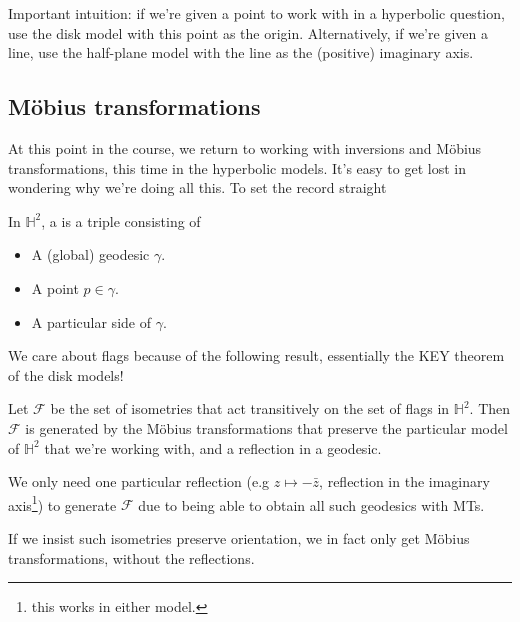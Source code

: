 \documentclass[11pt]{scrartcl}
\begin{document}
Important intuition: if we're given a point to work with in a hyperbolic question, use the disk model with this point as the origin. Alternatively, if we're given a line, use the half-plane model with the line as the (positive) imaginary axis.

\subsection{M{\"o}bius transformations}

At this point in the course, we return to working with inversions and M{\"o}bius transformations, this time in the hyperbolic models. It's easy to get lost in wondering why we're doing all this. To set the record straight

\begin{definition}
In $\mathbb{H}^2$, a  is a triple consisting of

\begin{itemize}
    \item A (global) geodesic $\gamma$.
    \item A point $p \in \gamma$.
    \item A particular side of $\gamma$.
\end{itemize}
\end{definition}

We care about flags because of the following result, essentially the KEY theorem of the disk models!

\begin{proposition}
Let $\mathcal{F}$ be the set of isometries that act transitively on the set of flags in $\mathbb{H}^2$. Then $\mathcal{F}$ is generated by the M{\"o}bius transformations that preserve the particular model of $\mathbb{H}^2$ that we're working with, and a reflection in a geodesic.
\end{proposition}

\begin{remark}
We only need one particular reflection (e.g $z \mapsto - \bar{z}$, reflection in the imaginary axis\footnote{this works in either model.}) to generate $\mathcal{F}$ due to being able to obtain all such geodesics with MTs.
\end{remark}

\begin{remark}
If we insist such isometries preserve orientation, we in fact only get M{\"o}bius transformations, without the reflections.
\end{remark}
\end{document}
